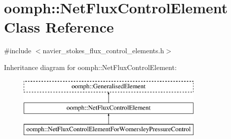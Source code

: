 \hypertarget{classoomph_1_1NetFluxControlElement}{}\section{oomph\+:\+:Net\+Flux\+Control\+Element Class Reference}
\label{classoomph_1_1NetFluxControlElement}


{\ttfamily \#include $<$navier\+\_\+stokes\+\_\+flux\+\_\+control\+\_\+elements.\+h$>$}

Inheritance diagram for oomph\+:\+:Net\+Flux\+Control\+Element\+:\begin{figure}[H]
\begin{center}
\leavevmode
\includegraphics[height=3.000000cm]{classoomph_1_1NetFluxControlElement}
\end{center}
\end{figure}
